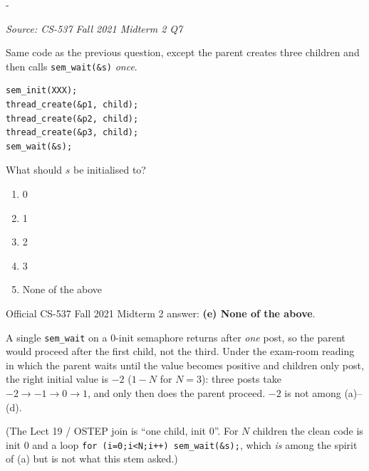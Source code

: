 \documentclass[11pt,a4paper]{article}
\makeatletter
\newcommand{\keepspace}[1]{\par\penalty-100\begingroup
  \setlength{\dimen@}{#1}\dimen@ii\pagegoal\advance\dimen@ii-\pagetotal
  \ifdim\dimen@>\dimen@ii\ifdim\dimen@ii>\z@\vfil\fi\break\fi\endgroup}
\newcounter{qn}[section]
\newenvironment{Qn}[4]{%
  \refstepcounter{qn}\keepspace{7\baselineskip}%
  \begin{tcolorbox}[qboxstyle, title={Q\thesection.\theqn\ \ [#1 \textbar\ #2]\ \ #4}]%
  {\footnotesize\color{g3}\textit{Source: #3}}\par\smallskip%
}{%
  \end{tcolorbox}%
}
\newenvironment{Sol}{%
  \begin{tcolorbox}[sboxstyle, title={Solution}]%
}{%
  \end{tcolorbox}\vspace{0.35em}%
}
\makeatother
\begin{document}
\begin{Qn}{Medium}{Lect 19}{CS-537 Fall 2021 Midterm 2 Q7}{Join with three children: what initial value?}
Same code as the previous question, except the parent creates three
children and then calls \texttt{sem\_wait(\&s)} \emph{once}.
\begin{lstlisting}[numbers=none]
sem_init(XXX);
thread_create(&p1, child);
thread_create(&p2, child);
thread_create(&p3, child);
sem_wait(&s);
\end{lstlisting}
What should $s$ be initialised to?
\begin{enumerate}
  \item[(a)] 0
  \item[(b)] 1
  \item[(c)] 2
  \item[(d)] 3
  \item[(e)] None of the above
\end{enumerate}
\end{Qn}
\begin{Sol}
Official CS-537 Fall 2021 Midterm 2 answer: \textbf{(e) None of the above}.

A single \texttt{sem\_wait} on a 0-init semaphore returns after
\emph{one} post, so the parent would proceed after the first child,
not the third. Under the exam-room reading in which the parent waits
until the value becomes positive and children only post, the right
initial value is $-2$ ($1-N$ for $N=3$): three posts take $-2 \to -1
\to 0 \to 1$, and only then does the parent proceed. $-2$ is not among
(a)--(d).

(The Lect 19 / OSTEP join is ``one child, init 0''. For $N$ children
the clean code is init 0 and a loop \texttt{for (i=0;i<N;i++)
sem\_wait(\&s);}, which \emph{is} among the spirit of (a) but is not
what this stem asked.)
\end{Sol}
\end{document}
